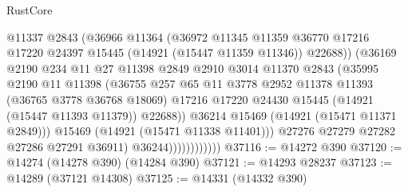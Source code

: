 \begin{lexlean}{RustCore}
\begin{coremodule}
                                @11337
                                @2843
                                (@36966
                                  @11364
                                  (@36972
                                    @11345
                                    @11359
                                    @36770
                                    @17216
                                    @17220
                                    @24397
                                    @15445
                                    (@14921 (@15447 @11359 @11346))
                                    @22688))
                                (@36169
                                  @2190
                                  @234
                                  @11
                                  @27
                                  @11398
                                  @2849
                                  @2910
                                  @3014
                                  @11370
                                  @2843
                                  (@35995
                                    @2190
                                    @11
                                    @11398
                                    (@36755
                                      @257
                                      @65
                                      @11
                                      @3778
                                      @2952
                                      @11378
                                      @11393
                                      (@36765 @3778 @36768 @18069)
                                      @17216
                                      @17220
                                      @24430
                                      @15445
                                      (@14921 (@15447 @11393 @11379))
                                      @22688))
                                  @36214
                                  @15469
                                  (@14921 (@15471 @11371 @2849)))
                                @15469
                                (@14921 (@15471 @11338 @11401)))
                              @27276
                              @27279
                              @27282
                              @27286
                              @27291
                              @36911)
                            @36244))))))))))))
@37116 := @14272 @390
@37120 := @14274 (@14278 @390) (@14284 @390)
@37121 := @14293 @28237
@37123 := @14289 (@37121 @14308)
@37125 := @14331 (@14332 @390)

\end{coremodule}
\end{lexlean}
